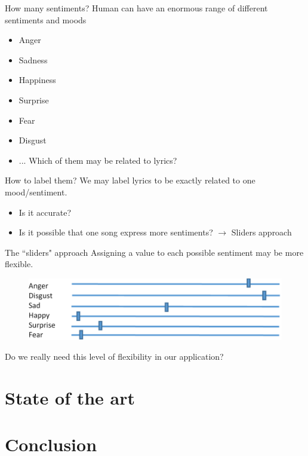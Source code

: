 \documentclass[xcolor=dvipsnames]{beamer}
\begin{document}
\begin{frame}{How many sentiments?}
Human can have an enormous range of different sentiments and moods
\begin{itemize}
\item Anger
\item Sadness
\item Happiness
\item Surprise
\item Fear
\item Disgust
\item ...
Which of them may be related to lyrics?
\end{itemize}
\end{frame}

\begin{frame}{How to label them?}
We may label lyrics to be exactly related to one mood/sentiment.
\begin{itemize}
\item Is it accurate?
\item Is it possible that one song express more sentiments? $\rightarrow$ Sliders approach
\end{itemize}
\end{frame}

\begin{frame}{The ``sliders" approach}
Assigning a value to each possible sentiment may be more flexible.
\begin{figure}
	\centering
	\includegraphics[scale=0.35]{./images/emotion_labeling_sliders}
\end{figure}
Do we really need this level of flexibility in our application?
\end{frame}


\section{State of the art}


\section{Conclusion}
\end{document}
